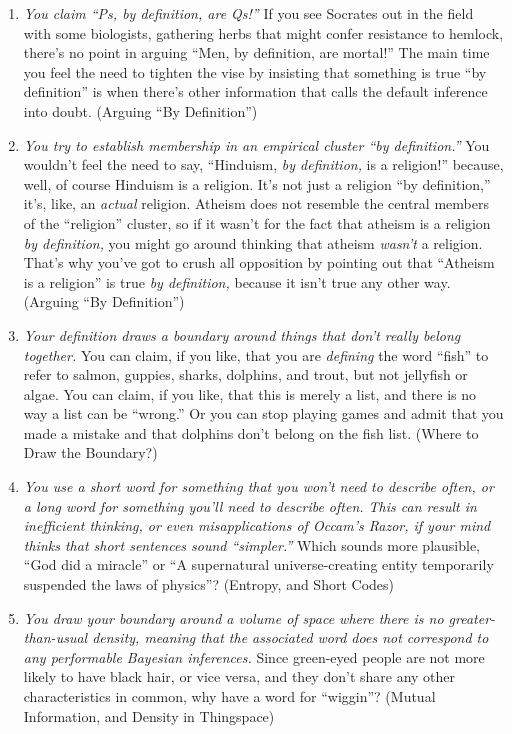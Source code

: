 {{\begin{enumerate}
\item {
 \textit{You claim ``Ps, by definition, are
Qs!''} If you see Socrates out in the field with some
biologists, gathering herbs that might confer resistance to hemlock,
there's no point in arguing ``Men, by
definition, are mortal!'' The main time you feel the
need to tighten the vise by insisting that something is true
``by definition'' is when
there's other information that calls the default
inference into doubt. (Arguing ``By
Definition'')}

\item {
 \textit{You try to establish membership in an empirical cluster
``by definition.''} You
wouldn't feel the need to say,
``Hinduism, \textit{by definition,} is a
religion!'' because, well, of course Hinduism is a
religion. It's not just a religion
``by definition,''
it's, like, an \textit{actual} religion. Atheism does
not resemble the central members of the
``religion'' cluster, so if it
wasn't for the fact that atheism is a religion
\textit{by definition,} you might go around thinking that atheism
\textit{wasn't} a religion. That's why
you've got to crush all opposition by pointing out that
``Atheism is a religion'' is true
\textit{by definition,} because it isn't true any other
way. (Arguing ``By Definition'')}

\item {
 \textit{Your definition draws a boundary around things that
don't really belong together.} You can claim, if you
like, that you are \textit{defining} the word
``fish'' to refer to salmon,
guppies, sharks, dolphins, and trout, but not jellyfish or algae. You
can claim, if you like, that this is merely a list, and there is no way
a list can be ``wrong.'' Or you can
stop playing games and admit that you made a mistake and that dolphins
don't belong on the fish list. (Where to Draw the
Boundary?)}

\item {
 \textit{You use a short word for something that you
won't need to describe often, or a long word for
something you'll need to describe often. This can
result in inefficient thinking, or even misapplications of
Occam's Razor, if your mind thinks that short sentences
sound ``simpler.''} Which sounds
more plausible, ``God did a
miracle'' or ``A supernatural
universe-creating entity temporarily suspended the laws of
physics''? (Entropy, and Short Codes)}

\item {
 \textit{You draw your boundary around a volume of space where
there is no greater-than-usual density, meaning that the associated
word does not correspond to any performable Bayesian inferences.} Since
green-eyed people are not more likely to have black hair, or vice
versa, and they don't share any other characteristics
in common, why have a word for
``wiggin''? (Mutual Information, and
Density in Thingspace)}


\end{enumerate}}}
